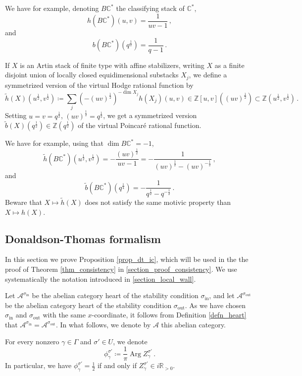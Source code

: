 \documentclass[12pt, a4paper]{amsart}
\newcommand\C{\mathbb C}
\newcommand\R{\mathbb R}
\newcommand\Z{\mathbb Z}
\newcommand\cA{\mathcal A}
\newcommand\Arg{\operatorname{Arg}}
\newcommand\iin{\mathrm{in}}
\newcommand\oout{\mathrm{out}}
\begin{document}
We have for example, denoting $B \C^{*}$ the classifying stack of $\C^{*}$,
\[ h(B \C^{*})(u,v)=\frac{1}{uv-1}\,,
\]
and 
\[ b(B\C^{*})(q^{\frac{1}{2}})=\frac{1}{q-1}\,.\]

If $X$ is an Artin stack of finite type with affine stabilizers, writing $X$ as a
finite
disjoint union of locally closed equidimensional substacks $X_j$, we define a symmetrized version of the virtual Hodge rational function by
\[ \tilde{h}(X)(u^{\frac{1}{2}},v^{\frac{1}{2}})\coloneq \sum_j(-(uv)^{\frac{1}{2}})^{-\dim X_j} h(X_j)(u,v) \in \Z[u,v]((uv)^{\frac{1}{2}}) \subset \Z(u^{\frac{1}{2}},v^{\frac{1}{2}})\,.\]
Setting $u=v
=q^{\frac{1}{2}}$, $(uv)^{\frac{1}{2}}=q^{\frac{1}{2}}$, we get a symmetrized version 
$\tilde{b}(X)(q^{\frac{1}{2}}) \in \Z(q^{\frac{1}{2}})$ of the virtual Poincar\'e rational function.

We have for example, using that $\dim 
B\C^{*}=-1$, 
\[ \tilde{h}(B\C^{*})(u^{\frac{1}{2}},v^{\frac{1}{2}})
=-\frac{(uv)^{\frac{1}{2}}}{uv-1}
=-\frac{1}{(uv)^{\frac{1}{2}}-(uv)^{-\frac{1}{2}}}\,,\]
and 
\[ \tilde{b}(B\C^{*})(q^{\frac{1}{4}})
=-\frac{1}{q^{\frac{1}{2}}-q^{-\frac{1}{2}}}\,.\]
Beware that $X \mapsto \tilde{h}(X)$ does not satisfy the same motivic property 
than $X \mapsto h(X)$.

\subsection{Donaldson-Thomas formalism}
\label{section_DT_formalism}

In this section we prove Proposition 
\ref{prop_dt_ic}, which will be used in the the proof of 
Theorem \ref{thm_consistency}
in \cref{section_proof_consistency}. We use 
systematically the notation introduced in \cref{section_local_wall}.

Let
$\cA^{\sigma_{\iin}}$ be the abelian category heart of the stability condition $\sigma_{\iin}$, and let  $\cA^{\sigma_{\oout}}$ be the abelian category heart of the stability condition
$\sigma_{\oout}$.
As we have chosen $\sigma_\iin$ and $\sigma_\oout$ with the same $x$-coordinate, it follows from Definition \ref{defn_heart} that $\cA^{\sigma_\iin}=\cA^{\sigma_\oout}$. In what follows, we denote by $\cA$ this abelian category.


For every nonzero $\gamma \in \Gamma$ and $\sigma' \in U$, we denote
\[ \phi_\gamma^{\sigma'} \coloneq \frac{1}{\pi} \Arg Z_\gamma^{\sigma'}\,.\]
In particular, we have $\phi_\gamma^{\sigma'}=\frac{1}{2}$ if and only if $Z_\gamma^{\sigma'} \in i \R_{>0}$.
\end{document}
